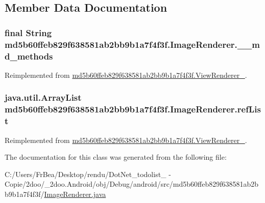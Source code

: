 \subsection{Member Data Documentation}
\hypertarget{classmd5b60ffeb829f638581ab2bb9b1a7f4f3f_1_1_image_renderer_270ae274b970d099f33432d32109ce8b}{
\subsubsection[{\_\-\_\-md\_\-methods}]{\setlength{\rightskip}{0pt plus 5cm}final String {\bf md5b60ffeb829f638581ab2bb9b1a7f4f3f.ImageRenderer.\_\-\_\-md\_\-methods}}}
\label{classmd5b60ffeb829f638581ab2bb9b1a7f4f3f_1_1_image_renderer_270ae274b970d099f33432d32109ce8b}




Reimplemented from \hyperlink{classmd5b60ffeb829f638581ab2bb9b1a7f4f3f_1_1_view_renderer__2_80b609e3e4054c380887d4dc2907a875}{md5b60ffeb829f638581ab2bb9b1a7f4f3f.ViewRenderer\_}.\hypertarget{classmd5b60ffeb829f638581ab2bb9b1a7f4f3f_1_1_image_renderer_1489fe181115bffda1ea70a17aeeaedc}{
\subsubsection[{refList}]{\setlength{\rightskip}{0pt plus 5cm}java.util.ArrayList {\bf md5b60ffeb829f638581ab2bb9b1a7f4f3f.ImageRenderer.refList}}}
\label{classmd5b60ffeb829f638581ab2bb9b1a7f4f3f_1_1_image_renderer_1489fe181115bffda1ea70a17aeeaedc}




Reimplemented from \hyperlink{classmd5b60ffeb829f638581ab2bb9b1a7f4f3f_1_1_view_renderer__2_6c151401977148a92c515e9c7de1aaf8}{md5b60ffeb829f638581ab2bb9b1a7f4f3f.ViewRenderer\_}.

The documentation for this class was generated from the following file:\begin{CompactItemize}
\item 
C:/Users/FrBea/Desktop/rendu/DotNet\_\-todolist\_ - Copie/2doo/\_\-2doo.Android/obj/Debug/android/src/md5b60ffeb829f638581ab2bb9b1a7f4f3f/\hyperlink{md5b60ffeb829f638581ab2bb9b1a7f4f3f_2_image_renderer_8java}{ImageRenderer.java}\end{CompactItemize}
